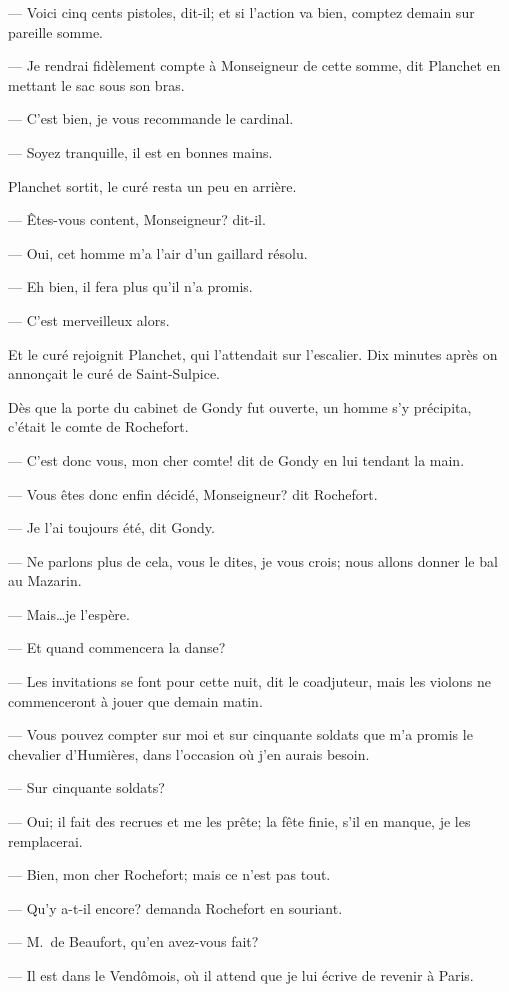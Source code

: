 — Voici cinq cents pistoles, dit-il; et si l'action va bien, comptez demain sur pareille somme.

— Je rendrai fidèlement compte à Monseigneur de cette somme, dit Planchet en mettant le sac sous son bras.

— C'est bien, je vous recommande le cardinal.

— Soyez tranquille, il est en bonnes mains.

Planchet sortit, le curé resta un peu en arrière.

— Êtes-vous content, Monseigneur? dit-il.

— Oui, cet homme m'a l'air d'un gaillard résolu.

— Eh bien, il fera plus qu'il n'a promis.

— C'est merveilleux alors.

Et le curé rejoignit Planchet, qui l'attendait sur l'escalier. Dix minutes après on annonçait le curé de Saint-Sulpice.

Dès que la porte du cabinet de Gondy fut ouverte, un homme s'y précipita, c'était le comte de Rochefort.

— C'est donc vous, mon cher comte! dit de Gondy en lui tendant la main.

— Vous êtes donc enfin décidé, Monseigneur? dit Rochefort.

— Je l'ai toujours été, dit Gondy.

— Ne parlons plus de cela, vous le dites, je vous crois; nous allons donner le bal au Mazarin.

— Mais\dots je l'espère.

— Et quand commencera la danse?

— Les invitations se font pour cette nuit, dit le coadjuteur, mais les violons ne commenceront à jouer que demain matin.

— Vous pouvez compter sur moi et sur cinquante soldats que m'a promis le chevalier d'Humières, dans l'occasion où j'en aurais besoin.

— Sur cinquante soldats?

— Oui; il fait des recrues et me les prête; la fête finie, s'il en manque, je les remplacerai.

— Bien, mon cher Rochefort; mais ce n'est pas tout.

— Qu'y a-t-il encore? demanda Rochefort en souriant.

— M.~de Beaufort, qu'en avez-vous fait?

— Il est dans le Vendômois, où il attend que je lui écrive de revenir à Paris.

